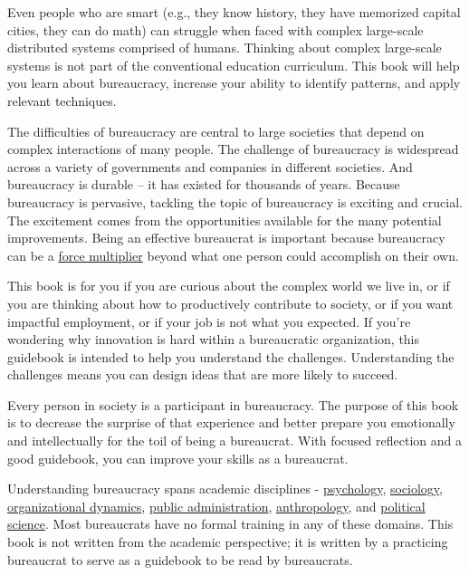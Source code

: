 Even people who are smart (e.g., they know history, they have memorized capital cities, they can do math) can struggle when faced with complex large-scale distributed systems comprised of humans. Thinking about complex large-scale systems is not part of the conventional education curriculum. This book will help you learn about bureaucracy, increase your ability to identify patterns, and apply relevant techniques.


The difficulties of bureaucracy are central to large societies that depend on complex interactions of many people. The challenge of bureaucracy is widespread across a variety of governments and companies in different societies. And bureaucracy is durable -- it has existed for thousands of years. Because bureaucracy is pervasive, tackling the topic of bureaucracy is exciting and crucial. The excitement comes from the opportunities available for the many potential improvements.
Being an effective bureaucrat is important because bureaucracy can be a \href{https://en.wikipedia.org/wiki/Force_multiplication}{force multiplier} beyond what one person could accomplish on their own.


This book is for you if you are curious about the complex world we live in, or if you are thinking about how to productively contribute to society, or if you want impactful employment, or if your job is not what you expected. If you're wondering why innovation is hard within a bureaucratic organization, this guidebook is intended to help you understand the challenges. Understanding the challenges means you can design ideas that are more likely to succeed.


Every person in society is a participant in bureaucracy. The purpose of this book is to decrease the surprise of that experience and better prepare you emotionally and intellectually for the toil of being a bureaucrat. With focused reflection and a good guidebook, you can improve your skills as a bureaucrat. 

Understanding bureaucracy spans academic disciplines - \href{https://en.wikipedia.org/wiki/Psychology}{psychology}, \href{https://en.wikipedia.org/wiki/Sociology}{sociology}, \href{https://en.wikipedia.org/wiki/Organizational_behavior}{organizational dynamics}, \href{https://en.wikipedia.org/wiki/Public_administration}{public administration}, \href{https://en.wikipedia.org/wiki/Anthropology}{anthropology}, and  \href{https://en.wikipedia.org/wiki/Political_science}{political science}. Most bureaucrats have no formal training in any of these domains. This book is not written from the academic perspective; it is written by a practicing bureaucrat to serve as a guidebook to be read by bureaucrats. 

